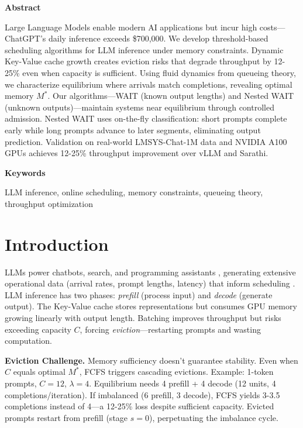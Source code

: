 
\begin{center}
\textbf{\fontsize{12}{14}\selectfont Abstract}
\end{center}

\noindent
Large Language Models enable modern AI applications but incur high costs—ChatGPT's daily inference exceeds \$700,000. We develop threshold-based scheduling algorithms for LLM inference under memory constraints. Dynamic Key-Value cache growth creates eviction risks that degrade throughput by 12-25\% even when capacity is sufficient. Using fluid dynamics from queueing theory, we characterize equilibrium where arrivals match completions, revealing optimal memory $M^*$. Our algorithms—WAIT (known output lengths) and Nested WAIT (unknown outputs)—maintain systems near equilibrium through controlled admission. Nested WAIT uses on-the-fly classification: short prompts complete early while long prompts advance to later segments, eliminating output prediction. Validation on real-world LMSYS-Chat-1M data and NVIDIA A100 GPUs achieves 12-25\% throughput improvement over vLLM and Sarathi.

\textbf{\fontsize{12}{14}\selectfont Keywords}

\noindent
LLM inference, online scheduling, memory constraints, queueing theory, throughput optimization

\section{Introduction}

LLMs power chatbots, search, and programming assistants \cite{brown2020language,openai2024gpt4technicalreport}, generating extensive operational data (arrival rates, prompt lengths, latency) that inform scheduling \cite{strubell2019energy}. LLM inference has two phases: \textit{prefill} (process input) and \textit{decode} (generate output). The Key-Value cache stores representations but consumes GPU memory growing linearly with output length. Batching improves throughput but risks exceeding capacity $C$, forcing \textit{eviction}—restarting prompts and wasting computation.

\textbf{Eviction Challenge.} Memory sufficiency doesn't guarantee stability. Even when $C$ equals optimal $M^*$, FCFS triggers cascading evictions. Example: 1-token prompts, $C = 12$, $\lambda = 4$. Equilibrium needs 4 prefill + 4 decode (12 units, 4 completions/iteration). If imbalanced (6 prefill, 3 decode), FCFS yields 3-3.5 completions instead of 4—a 12-25\% loss despite sufficient capacity. Evicted prompts restart from prefill (stage $s=0$), perpetuating the imbalance cycle.

